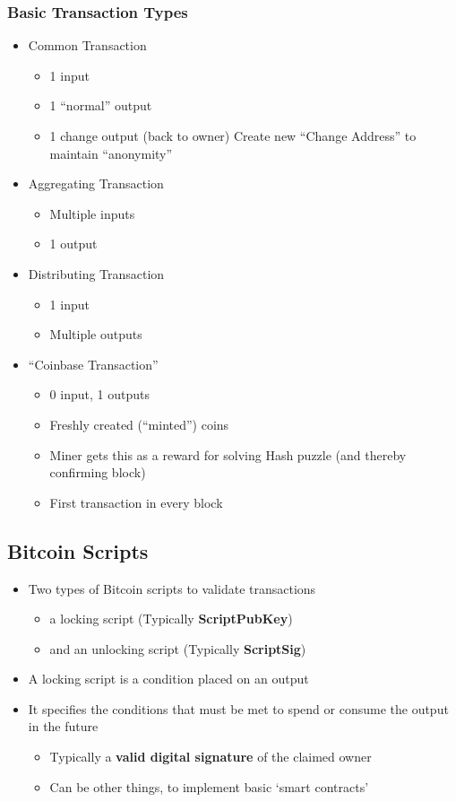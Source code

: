 \subsubsection{Basic Transaction Types}
\begin{itemize}
	\item Common Transaction
	\begin{itemize}
		\item 1 input
		\item 1 ``normal'' output
		\item 1 change output (back to owner)
		\subitem Create new ``Change Address'' to maintain ``anonymity''
	\end{itemize}
	\item Aggregating Transaction
	\begin{itemize}
		\item Multiple inputs
		\item 1 output
	\end{itemize}
	\item Distributing Transaction
	\begin{itemize}
		\item 1 input
		\item Multiple outputs
	\end{itemize}
	\item ``Coinbase Transaction''
	\begin{itemize}
		\item 0 input, 1 outputs
		\item Freshly created (``minted'') coins
		\item Miner gets this as a reward for solving Hash puzzle (and thereby confirming block)
		\item First transaction in every block
	\end{itemize}
\end{itemize}

\subsection{Bitcoin Scripts}
\begin{itemize}
	\item Two types of Bitcoin scripts to validate transactions
	\begin{itemize}
		\item a locking script (Typically \textbf{ScriptPubKey})
		\item and an unlocking script (Typically \textbf{ScriptSig})
	\end{itemize}
	\item A locking script is a condition placed on an output
	\item It specifies the conditions that must be met to spend or consume the output in the future
	\begin{itemize}
		\item Typically a \textbf{valid digital signature} of the claimed owner
		\item Can be other things, to implement basic `smart contracts'
	\end{itemize}
\end{itemize}

